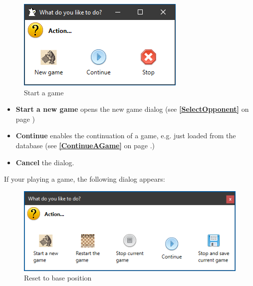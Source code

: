 \documentclass[11pt,a4paper]{article}
\begin{document}
\begin{figure}[H]
	\centering
	\includegraphics[scale=1.0]{resetToBasePosition2.png}
	\caption{Start a game}
	\label{fig:resetToBasePosition2}
\end{figure}

\begin{itemize}
	\item \textbf{Start a new game} opens the new game dialog (see \textbf{\ref{SelectOpponent}  } on page \pageref{SelectOpponent})
	\item \textbf{Continue} enables the continuation of a game, e.g. just loaded from the database (see \textbf{\ref{ContinueAGame}  } on page \pageref{ContinueAGame}.)
	\item \textbf{Cancel} the dialog.
\end{itemize}

If your playing a game, the following dialog appears:

\begin{figure}[H]
	\centering
	\includegraphics[scale=0.9]{resetToBasePosition.png}
	\caption{Reset to base position}
	\label{fig:resetToBasePosition}
\end{figure}
\end{document}
